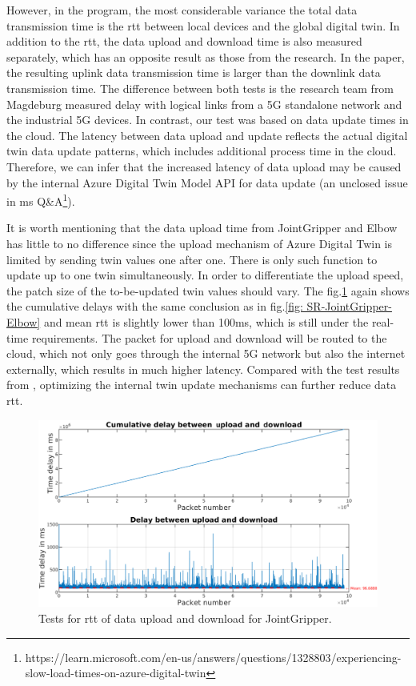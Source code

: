 However, in the program, the most considerable variance 
the total data transmission time is the \gls{rtt} between local devices and the global digital 
twin. In addition to the \gls{rtt}, the data upload and download time is also measured 
separately, which has an opposite result as those from the research\cite{cainelli_performance_2023}. 
In the paper, the resulting uplink data transmission time is larger than the downlink 
data transmission time. The difference between both tests is the research team from 
Magdeburg measured delay with logical links from a 5G standalone network and the industrial 
5G devices. In contrast, our test was based on data update times in the cloud. The latency 
between data upload and update reflects the actual digital twin data update patterns, 
which includes additional process time in the cloud. Therefore, we can infer that the 
increased latency of data upload may be caused by the internal Azure Digital Twin Model 
API for data update (an unclosed issue in \gls{ms} Q\&A\footnote{https://learn.microsoft.com/en-us/answers/questions/1328803/experiencing-slow-load-times-on-azure-digital-twin}).
    

It is worth mentioning that the data upload time from JointGripper and Elbow has little to 
no difference since the upload mechanism of Azure Digital Twin is limited by sending twin 
values one after one. There is only such function to update up to one twin simultaneously. 
In order to differentiate the upload speed, the patch size of the to-be-updated twin values 
should vary. The fig.\ref{fig: UD-cycle-JointGripper} again shows the cumulative delays 
with the same conclusion as in fig.\ref{fig: SR-JointGripper-Elbow} and mean \gls{rtt} is 
slightly lower than 100ms, which is still under the real-time requirements. The packet for 
upload and download will be routed to the cloud, which not only goes through the internal 
5G network but also the internet externally, which results in much higher latency. Compared 
with the test results from \cite{cainelli_performance_2023}, optimizing the internal twin 
update mechanisms can further reduce data \gls{rtt}. 


\begin{figure}[htb]
    \includegraphics[width=\textwidth]{figures/tests/DT/Delay_UploadDownloadCycleTime_JointGripper.pdf}
    \centering
    \caption{Tests for \gls{rtt} of data upload and download for JointGripper. \label{fig: UD-cycle-JointGripper}}
\end{figure}

